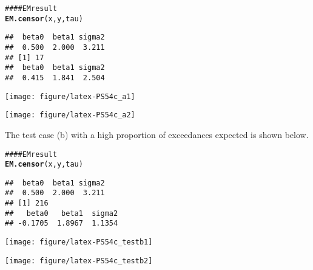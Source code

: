 \documentclass{article}\usepackage{graphicx, color}
\makeatletter
\def\maxwidth{ %
  \ifdim\Gin@nat@width>\linewidth
    \linewidth
  \else
    \Gin@nat@width
  \fi
}
\newcommand{\hlfunctioncall}[1]{\textcolor[rgb]{0.501960784313725,0,0.329411764705882}{\textbf{#1}}}%
\newcommand{\hlcomment}[1]{\textcolor[rgb]{0.180392156862745,0.6,0.341176470588235}{#1}}%
\newenvironment{kframe}{%
 \def\at@end@of@kframe{}%
 \ifinner\ifhmode%
  \def\at@end@of@kframe{\end{minipage}}%
  \begin{minipage}{\columnwidth}%
 \fi\fi%
 \def\FrameCommand##1{\hskip\@totalleftmargin \hskip-\fboxsep
 \colorbox{shadecolor}{##1}\hskip-\fboxsep
     \hskip-\linewidth \hskip-\@totalleftmargin \hskip\columnwidth}%
 \MakeFramed {\advance\hsize-\width
   \@totalleftmargin\z@ \linewidth\hsize
   \@setminipage}}%
 {\par\unskip\endMakeFramed%
 \at@end@of@kframe}
\newenvironment{knitrout}{}{} %
\makeatother
\begin{document}
\begin{knitrout}
\color{fgcolor}\begin{kframe}
\begin{alltt}
\hlcomment{#### EM result}
\hlfunctioncall{EM.censor}(x, y, tau)
\end{alltt}
\begin{verbatim}
##  beta0  beta1 sigma2 
##  0.500  2.000  3.211 
## [1] 17
##  beta0  beta1 sigma2 
##  0.415  1.841  2.504
\end{verbatim}
\end{kframe}

{\centering \texttt{[image: figure/latex-PS54c\_a1]} 

}




{\centering \texttt{[image: figure/latex-PS54c\_a2]} 

}



\end{knitrout}


\newpage
The test case (b) with a high proportion of exceedances expected is shown below.
\begin{knitrout}
\color{fgcolor}\begin{kframe}
\begin{alltt}
\hlcomment{#### EM result}
\hlfunctioncall{EM.censor}(x, y, tau)
\end{alltt}
\end{kframe}
\end{knitrout}

\begin{knitrout}
\color{fgcolor}\begin{kframe}
\begin{verbatim}
##  beta0  beta1 sigma2 
##  0.500  2.000  3.211 
## [1] 216
##   beta0   beta1  sigma2 
## -0.1705  1.8967  1.1354
\end{verbatim}
\end{kframe}

{\centering \texttt{[image: figure/latex-PS54c\_testb1]} 

}




{\centering \texttt{[image: figure/latex-PS54c\_testb2]} 

}



\end{knitrout}
\end{document}
